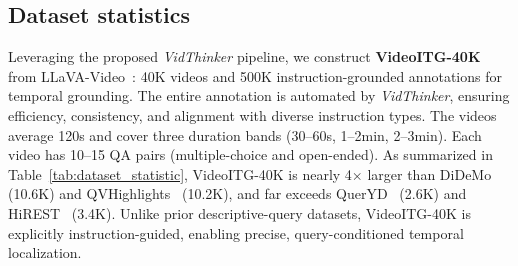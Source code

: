 \subsection{Dataset statistics}
\label{statistics}
Leveraging the proposed \textit{VidThinker} pipeline, we construct \textbf{VideoITG-40K} from LLaVA-Video~\cite{zhang2024video}: 40K videos and 500K instruction-grounded annotations for temporal grounding. The entire annotation is automated by \textit{VidThinker}, ensuring efficiency, consistency, and alignment with diverse instruction types. The videos average 120s and cover three duration bands (30–60s, 1–2min, 2–3min). Each video has 10–15 QA pairs (multiple-choice and open-ended). As summarized in Table~\ref{tab:dataset_statistic}, VideoITG-40K is nearly 4$\times$ larger than DiDeMo~\cite{anne2017localizing} (10.6K) and QVHighlights~\cite{lei2021detecting} (10.2K), and far exceeds QuerYD~\cite{oncescu2021queryd} (2.6K) and HiREST~\cite{zala2023hierarchical} (3.4K). Unlike prior descriptive-query datasets, VideoITG-40K is explicitly instruction-guided, enabling precise, query-conditioned temporal localization.


\begin{table}[h]
\renewcommand{\arraystretch}{1.0}
\centering
\caption{
\textbf{Comparison of dataset statistics for temporal grounding and highlight detection datasets.}
}
\vspace{-2mm}
\Large
{}
\label{tab:dataset_statistic}
\vspace{-2mm}
\end{table}
